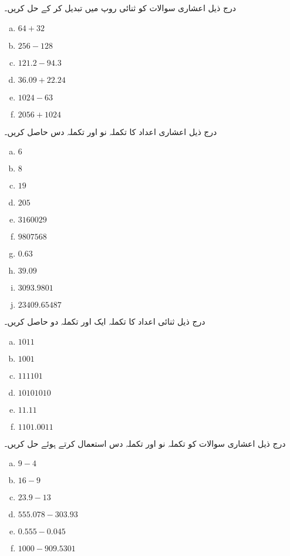 درج ذیل اعشاری سوالات کو ثنائی روپ میں تبدیل کر کے حل کریں۔
\begin{multicols}{4}
\begin{enumerate}[a.]

\item  
 \(64+32\)  
\item  
 \(256-128\) 
\item  
 \(121.2-94.3\) 
\item  
 \(36.09+22.24\)  
\item  
 \(1024-63\) 
\item  
 \(2056+1024\)    
\end{enumerate}
\end{multicols}
درج ذیل اعشاری اعداد کا تکملہ نو اور تکملہ دس حاصل کریں۔
\begin{multicols}{4}
\begin{enumerate}[a.]
\item  
 \(6\)  
\item   
 \(8\) 
\item  
 \(19\)  
\item   
 \(205\) 
\item  
 \(3160029\) 
\item   
 \(9807568\) 
\item  
 \(0.63\)  
\item   
 \(39.09\) 
\item  
 \(3093.9801\) 
\item   
 \(23409.65487\) 
\end{enumerate}
\end{multicols}
درج ذیل ثنائی اعداد کا تکملہ ایک اور تکملہ دو حاصل کریں۔
\begin{multicols}{4}
\begin{enumerate}[a.]

\item  
 \(1011\)  
\item   
 \(1001\) 
\item  
 \(111101\) 
\item   
 \(10101010\) 
\item  
 \(11.11\)  
\item   
 \(1101.0011\) 
\end{enumerate}
\end{multicols}
درج ذیل اعشاری سوالات کو تکملہ نو اور تکملہ دس استعمال کرتے ہوئے حل کریں۔
\begin{multicols}{3}
\begin{enumerate}[a.]

\item  
 \(9-4\)  
\item   
 \(16-9\) 
\item  
 \(23.9-13\) 
\item  
 \(555.078-303.93\) 
\item  
 \(0.555-0.045\) 
\item  
 \(1000-909.5301\) 
\end{enumerate}
\end{multicols}
